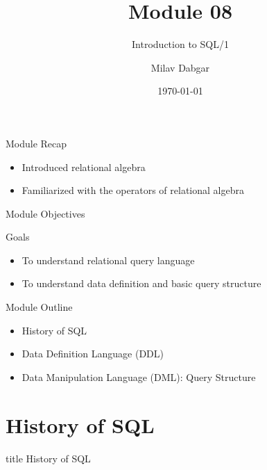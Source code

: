 \documentclass[aspectratio=169, xcolor=dvipsnames]{beamer}
\title{Module 08}
\subtitle{Introduction to SQL/1}
\author{Milav Dabgar}
\institute{www.milav.in}
\date{\today}
\begin{document}
\begin{frame}
    \titlepage
\end{frame}

\begin{frame}{Module Recap}
    \begin{itemize}[<+->]
        \item Introduced relational algebra
        \item Familiarized with the operators of relational algebra
    \end{itemize}
\end{frame}

\begin{frame}{Module Objectives}
    \begin{block}{Goals}
        \begin{itemize}[<+->]
            \item To understand relational query language
            \item To understand data definition and basic query structure
        \end{itemize}
    \end{block}
\end{frame}

\begin{frame}{Module Outline}
    \begin{itemize}[<+->]
        \item History of SQL
        \item Data Definition Language (DDL)
        \item Data Manipulation Language (DML): Query Structure
    \end{itemize}
\end{frame}

\section{History of SQL}

\begin{frame}
  \vfill
  \centering
  \begin{beamercolorbox}[sep=8pt,center,shadow=true,rounded=true]{title}
    History of SQL\par%
  \end{beamercolorbox}
  \vfill
\end{frame}
\end{document}
